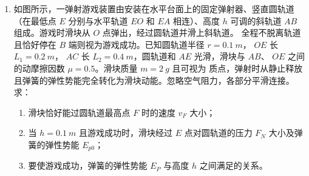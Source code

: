 \begin{enumerate}


\item
如图所示，一弹射游戏装置由安装在水平台面上的固定弹射器、竖直圆轨道（在最低点 $ E $ 分别与水平轨道 $ EO $ 和 $ EA $ 相连）、高度 $ h $ 可调的斜轨道 $ AB $ 组成。游戏时滑块从 $ O $ 点弹出，经过圆轨道并滑上斜轨道。
全程不脱离轨道且恰好停在 $ B $ 端则视为游戏成功。已知圆轨道半径 $ r=0.1 \ m $， $ OE $ 长 $ L_{1} =0.2 \ m $， $ AC $ 长
$ L_{2} =0.4 \ m $，圆轨道和 $ AE $ 光滑，滑块与 $ AB $、 $ OE $ 之间的动摩擦因数 $ \mu=0.5 $。滑块质量 $ m=2 \ g $ 且可视为
质点，弹射时从静止释放且弹簧的弹性势能完全转化为滑块动能。忽略空气阻力，各部分平滑连接。求：
\begin{enumerate}
\item
滑块恰好能过圆轨道最高点 $ F $ 时的速度 $ v_F $ 大小；
\item 
当 $ h=0.1 \ m $ 且游戏成功时，滑块经过 $ E $ 点对圆轨道的压力 $ F_{N} $ 大小及弹簧的弹性势能 $ E_{p0} $；
\item 
要使游戏成功，弹簧的弹性势能 $ E_{P} $ 与高度 $ h $ 之间满足的关系。

\end{enumerate}
\begin{figure}[h!]
\flushright

\end{figure}






\end{enumerate}
